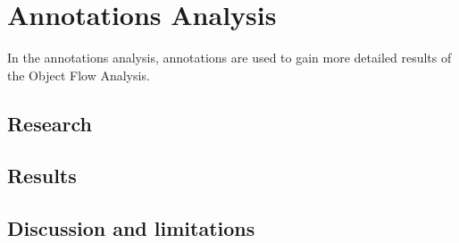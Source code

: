 \documentclass[main.tex]{subfiles}
\begin{document}
    \section{Annotations Analysis}\label{sec:annotations_analysis}
        In the annotations analysis, annotations are used to gain more detailed results of the Object Flow Analysis.
    
    \subsection{Research}\label{subsec:aa_research}

    \subsection{Results}\label{subsec:aa_results}

    \subsection{Discussion and limitations}\label{subsec:aa_discussion}
        
\end{document}
